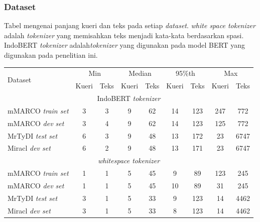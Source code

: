 \documentclass[10pt]{beamer}
\newcommand{\f}[1]{\textit{#1}}
\begin{document}
\begin{frame}
    \frametitle{Dataset}
    
    Tabel mengenai panjang kueri dan teks pada setiap \f{dataset}. \f{white space tokenizer} adalah \f{tokenizer} yang memisahkan teks menjadi kata-kata berdasarkan spasi. IndoBERT \f{tokenizer} adalah\f{tokenizer} yang digunakan pada model BERT yang digunakan pada penelitian ini.

    \begin{table}
        \footnotesize
        \begin{tabular}{lcccccccc}
            \multirow{2}{*}{Dataset} & \multicolumn{2}{c}{Min} & \multicolumn{2}{c}{Median} & \multicolumn{2}{c}{95\%th} & \multicolumn{2}{c}{Max} \\
            \cline{2-9}
            & Kueri & Teks & Kueri & Teks & Kueri & Teks & Kueri & Teks \\
            \multicolumn{9}{c}{IndoBERT \f{tokenizer}} \\
            \hline
            mMARCO \f{train set} & 3 & 3 & 9 & 62 & 14 & 123 & 247 & 772 \\
            mMARCO \f{dev set}   & 3 & 4 & 9 & 62 & 14 & 123 & 125 & 772 \\
            MrTyDI \f{test set}  & 6 & 3 & 9 & 48 & 13 & 172 & 23 & 6747 \\
            Miracl \f{dev set}   & 6 & 2 & 9 & 48 & 13 & 171 & 23 & 6747 \\
            \hline
            \multicolumn{9}{c}{\f{whitespace tokenizer}} \\
            mMARCO \f{train set} & 1 & 1 & 5 & 45 & 9 & 89 & 123 & 245 \\
            mMARCO \f{dev set}   & 1 & 1 & 5 & 45 & 10 & 89 & 31 & 245 \\
            MrTyDI \f{test set}  & 3 & 1 & 5 & 33 & 9 & 123 & 14 & 4462 \\
            Miracl \f{dev set}   & 3 & 1 & 5 & 33 & 8 & 123 & 14 & 4462 \\
            \hline
        \end{tabular}
    \end{table}
\end{frame}
\end{document}
